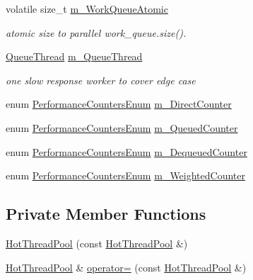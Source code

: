 \begin{DoxyCompactItemize}
volatile size\+\_\+t \hyperlink{classleveldb_1_1_hot_thread_pool_a3a0aafc7c581ea064fb79c334d918d57}{m\+\_\+\+Work\+Queue\+Atomic}
\begin{DoxyCompactList}\small\item\em atomic size to parallel work\+\_\+queue.\+size(). \end{DoxyCompactList}\item 
\hyperlink{structleveldb_1_1_queue_thread}{Queue\+Thread} \hyperlink{classleveldb_1_1_hot_thread_pool_a061ea39c8e7d9fcab1a331c4955fc181}{m\+\_\+\+Queue\+Thread}
\begin{DoxyCompactList}\small\item\em one slow response worker to cover edge case \end{DoxyCompactList}\item 
enum \hyperlink{namespaceleveldb_a0ba185501d4b24cf13090cf641fc637a}{Performance\+Counters\+Enum} \hyperlink{classleveldb_1_1_hot_thread_pool_addcf8d7da65f452d5bb0d2e96facd741}{m\+\_\+\+Direct\+Counter}
\item 
enum \hyperlink{namespaceleveldb_a0ba185501d4b24cf13090cf641fc637a}{Performance\+Counters\+Enum} \hyperlink{classleveldb_1_1_hot_thread_pool_aac7b6600773035c7499721eb42ab2075}{m\+\_\+\+Queued\+Counter}
\item 
enum \hyperlink{namespaceleveldb_a0ba185501d4b24cf13090cf641fc637a}{Performance\+Counters\+Enum} \hyperlink{classleveldb_1_1_hot_thread_pool_a7e28dd1d6f7607c7840f4b0604a2d43e}{m\+\_\+\+Dequeued\+Counter}
\item 
enum \hyperlink{namespaceleveldb_a0ba185501d4b24cf13090cf641fc637a}{Performance\+Counters\+Enum} \hyperlink{classleveldb_1_1_hot_thread_pool_a2ecf9d61378505a8f43335bc2017078b}{m\+\_\+\+Weighted\+Counter}
\end{DoxyCompactItemize}
\subsection*{Private Member Functions}
\begin{DoxyCompactItemize}
\item 
\hyperlink{classleveldb_1_1_hot_thread_pool_a3688e5840f06f36542ed7ad04ee31289}{Hot\+Thread\+Pool} (const \hyperlink{classleveldb_1_1_hot_thread_pool}{Hot\+Thread\+Pool} \&)
\item 
\hyperlink{classleveldb_1_1_hot_thread_pool}{Hot\+Thread\+Pool} \& \hyperlink{classleveldb_1_1_hot_thread_pool_a9e28c6948e1bc38fac95bee1fb968e87}{operator=} (const \hyperlink{classleveldb_1_1_hot_thread_pool}{Hot\+Thread\+Pool} \&)
\end{DoxyCompactItemize}


